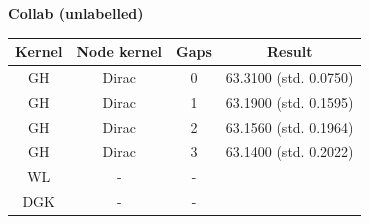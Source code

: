 \documentclass{article}
\begin{document}
\textbf{Collab (unlabelled)}\\
\begin{minipage}{0.6\linewidth}
	\hspace*{-1in}

	\label{fig:collab_unlabelled}
\end{minipage}
\begin{minipage}[c]{0.5\linewidth}
	
	\centering
	\begin{tabular}{c|c|c|c}
		Kernel & Node kernel & Gaps & Result\\
		\hline
		GH & Dirac & 0 & 63.3100 (std. 0.0750) \\
		GH & Dirac & 1 & 63.1900 (std. 0.1595) \\
		GH & Dirac & 2 & 63.1560 (std. 0.1964) \\
		GH & Dirac & 3 & 63.1400 (std. 0.2022) \\
		WL & - & - & \\
		DGK & - & - &
	\end{tabular}
	\label{table:collab_unlabelled}
\end{minipage}
\end{document}
